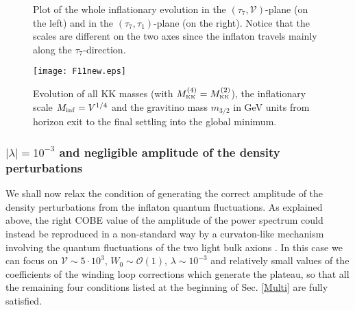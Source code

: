 \documentclass[11pt,a4paper]{article}
\def\KK{{\scriptscriptstyle \rm KK}}
\newcommand\vo{{\mathcal{V}}}
\newcommand{\mc}{\mathcal}
\begin{document}
\begin{figure}[ht]
\begin{center}
\caption{Plot of the whole inflationary evolution in the $(\tau_7, \vo)$-plane (on the left) and in the $(\tau_7, \tau_1)$-plane (on the right). Notice that the scales are different on the two axes since the inflaton travels mainly along the $\tau_7$-direction.}
\label{FigParam}
\end{center}
\end{figure}

\begin{figure}[h!]
\begin{center}
\texttt{[image: F11new.eps]}
\caption{Evolution of all KK masses (with $M_\KK^{(4)}=M_\KK^{(2)}$), the inflationary scale $M_{\rm inf} = V^{1/4}$ and the gravitino mass $m_{3/2}$ in GeV units from horizon exit to the final settling into the global minimum.}
\label{FigKK}
\end{center}
\end{figure}

\subsubsection{$|\lambda| = 10^{-3}$ and negligible amplitude of the density perturbations}
\label{NoCobeCase}

We shall now relax the condition of generating the correct amplitude of the density perturbations from the inflaton quantum fluctuations. As explained above, the right COBE value of the amplitude of the power spectrum could instead be reproduced in a non-standard way by a curvaton-like mechanism involving the quantum fluctuations of the two light bulk axions \cite{curvaton}. In this case we can focus on $\vo\sim 5\cdot 10^3$, $W_0\sim\mc{O}(1)$, $\lambda\sim 10^{-3}$ and relatively small values of the coefficients of the winding loop corrections which generate the plateau, so that all the remaining four conditions listed at the beginning of Sec. \ref{Multi} are fully satisfied. 
\end{document}
